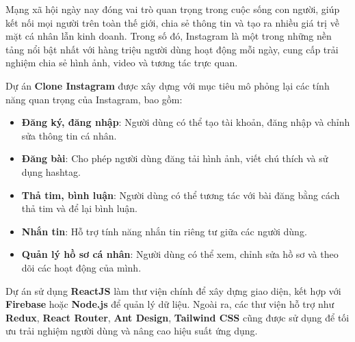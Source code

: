 

\vspace{0.5cm} %

Mạng xã hội ngày nay đóng vai trò quan trọng trong cuộc sống con người, giúp kết nối mọi người trên toàn thế giới, chia sẻ thông tin và tạo ra nhiều giá trị về mặt cá nhân lẫn kinh doanh. Trong số đó, Instagram là một trong những nền tảng nổi bật nhất với hàng triệu người dùng hoạt động mỗi ngày, cung cấp trải nghiệm chia sẻ hình ảnh, video và tương tác trực quan.

Dự án \textbf{Clone Instagram} được xây dựng với mục tiêu mô phỏng lại các tính năng quan trọng của Instagram, bao gồm:
\begin{itemize}
    \renewcommand{\labelitemi}{-} %
    \item \textbf{Đăng ký, đăng nhập}: Người dùng có thể tạo tài khoản, đăng nhập và chỉnh sửa thông tin cá nhân.
    \item \textbf{Đăng bài}: Cho phép người dùng đăng tải hình ảnh, viết chú thích và sử dụng hashtag.
    \item \textbf{Thả tim, bình luận}: Người dùng có thể tương tác với bài đăng bằng cách thả tim và để lại bình luận.
    \item \textbf{Nhắn tin}: Hỗ trợ tính năng nhắn tin riêng tư giữa các người dùng.
    \item \textbf{Quản lý hồ sơ cá nhân}: Người dùng có thể xem, chỉnh sửa hồ sơ và theo dõi các hoạt động của mình.
\end{itemize}

Dự án sử dụng \textbf{ReactJS} làm thư viện chính để xây dựng giao diện, kết hợp với \textbf{Firebase} hoặc \textbf{Node.js} để quản lý dữ liệu. Ngoài ra, các thư viện hỗ trợ như \textbf{Redux}, \textbf{React Router}, \textbf{Ant Design}, \textbf{Tailwind CSS} cũng được sử dụng để tối ưu trải nghiệm người dùng và nâng cao hiệu suất ứng dụng.\\ \\
